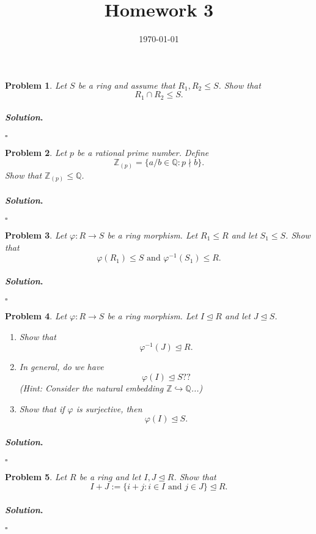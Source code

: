 \documentclass[reqno]{amsart}
\theoremstyle{plain}
\newtheorem{problem}{Problem}
\theoremstyle{definition}
\newenvironment{solution}{\paragraph{\emph{Solution}.}}{\hfill$\square$}
\begin{document}
 

\title[Homework 3]{Homework 3}

\date{\today} 
\maketitle 


\begin{problem}
Let $S$ be a ring and assume that $R_{1}, R_{2} \le S$.  Show that
$$R_{1} \cap R_{2} \le S. $$
\end{problem}
\begin{solution}

\end{solution}

\begin{problem}
Let $p$ be a rational prime number.  Define
$$\mathbb{Z}_{(p)} = \{ a/b \in \mathbb{Q} : p \nmid b\}. $$
Show that $\mathbb{Z}_{(p)} \le \mathbb{Q}$.
\end{problem}
\begin{solution}

\end{solution}

\begin{problem}
Let $\varphi:R \rightarrow S$ be a ring morphism.  Let $R_{1} \le R$ and let $S_{1} \le S$.  Show that
$$\varphi(R_{1}) \le S \text{ and } \varphi^{-1}(S_{1}) \le R. $$
\end{problem}
\begin{solution}

\end{solution}

\begin{problem}
Let $\varphi:R \rightarrow S$ be a ring morphism.  Let $I \trianglelefteq R$ and let $J \trianglelefteq S$.  
\begin{enumerate}
\item Show that
$$\varphi^{-1}(J) \trianglelefteq R. $$
\item In general, do we have
$$\varphi(I) \trianglelefteq S?? $$
(Hint:  Consider the natural embedding $\mathbb{Z} \hookrightarrow \mathbb{Q}$...)
\item Show that if $\varphi$ is surjective, then
$$\varphi(I) \trianglelefteq S. $$
\end{enumerate}
\end{problem}
\begin{solution}

\end{solution}


\begin{problem}
Let $R$ be a ring and let  $I, J \trianglelefteq R$.  Show that
$$I + J := \{i + j : i \in I \text{ and } j \in J \} \trianglelefteq R. $$
\end{problem}
\begin{solution}

\end{solution}
\end{document}
